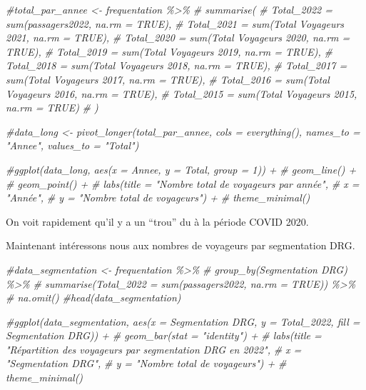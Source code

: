 \documentclass[
]{article}
\newenvironment{Shaded}{\begin{snugshade}}{\end{snugshade}}
\newcommand{\CommentTok}[1]{\textcolor[rgb]{0.56,0.35,0.01}{\textit{#1}}}
\begin{document}
\begin{Shaded}
\begin{Highlighting}[]
\CommentTok{\#total\_par\_annee \textless{}{-} frequentation \%\textgreater{}\%}
\CommentTok{\#  summarise(}
\CommentTok{\#    Total\_2022 = sum(\textasciigrave{}passagers2022\textasciigrave{}, na.rm = TRUE),}
\CommentTok{\#    Total\_2021 = sum(\textasciigrave{}Total Voyageurs 2021\textasciigrave{}, na.rm = TRUE),}
\CommentTok{\#    Total\_2020 = sum(\textasciigrave{}Total Voyageurs 2020\textasciigrave{}, na.rm = TRUE),}
\CommentTok{\#    Total\_2019 = sum(\textasciigrave{}Total Voyageurs 2019\textasciigrave{}, na.rm = TRUE),}
\CommentTok{\#    Total\_2018 = sum(\textasciigrave{}Total Voyageurs 2018\textasciigrave{}, na.rm = TRUE),}
\CommentTok{\#    Total\_2017 = sum(\textasciigrave{}Total Voyageurs 2017\textasciigrave{}, na.rm = TRUE),}
\CommentTok{\#    Total\_2016 = sum(\textasciigrave{}Total Voyageurs 2016\textasciigrave{}, na.rm = TRUE),}
\CommentTok{\#    Total\_2015 = sum(\textasciigrave{}Total Voyageurs 2015\textasciigrave{}, na.rm = TRUE)}
\CommentTok{\#  )}

\CommentTok{\#data\_long \textless{}{-} pivot\_longer(total\_par\_annee, cols = everything(), names\_to = "Annee", values\_to = "Total")}

\CommentTok{\#ggplot(data\_long, aes(x = Annee, y = Total, group = 1)) +}
\CommentTok{\#  geom\_line() +  }
\CommentTok{\#  geom\_point() +  }
\CommentTok{\#  labs(title = "Nombre total de voyageurs par année",}
\CommentTok{\#       x = "Année",}
\CommentTok{\#       y = "Nombre total de voyageurs") +}
\CommentTok{\#  theme\_minimal()}
\end{Highlighting}
\end{Shaded}

On voit rapidement qu'il y a un ``trou'' du à la période COVID 2020.

Maintenant intéressons nous aux nombres de voyageurs par segmentation
DRG.

\begin{Shaded}
\begin{Highlighting}[]
\CommentTok{\#data\_segmentation \textless{}{-} frequentation \%\textgreater{}\%}
\CommentTok{\#  group\_by(\textasciigrave{}Segmentation DRG\textasciigrave{}) \%\textgreater{}\%}
\CommentTok{\#  summarise(Total\_2022 = sum(\textasciigrave{}passagers2022\textasciigrave{}, na.rm = TRUE)) \%\textgreater{}\%}
\CommentTok{\#  na.omit()}
\CommentTok{\#head(data\_segmentation)}

\CommentTok{\#ggplot(data\_segmentation, aes(x = \textasciigrave{}Segmentation DRG\textasciigrave{}, y = Total\_2022, fill = \textasciigrave{}Segmentation DRG\textasciigrave{})) +}
\CommentTok{\#  geom\_bar(stat = "identity") +}
\CommentTok{\#  labs(title = "Répartition des voyageurs par segmentation DRG en 2022",}
\CommentTok{\#       x = "Segmentation DRG",}
\CommentTok{\#       y = "Nombre total de voyageurs") +}
\CommentTok{\#  theme\_minimal()}
\end{Highlighting}
\end{Shaded}
\end{document}
